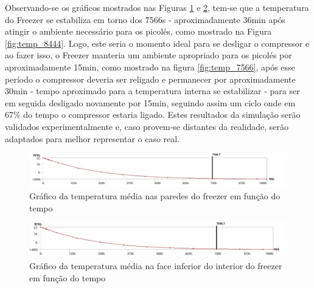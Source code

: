 \begin{itemize}

Observando-se os gráficos mostrados nas Figuras \ref{fig:graph1} e \ref{fig:graph2}, tem-se que a temperatura do Freezer se estabiliza em torno dos 7566s - aproximadamente 36min após atingir o ambiente necessário para os picolés, como mostrado na Figura \ref{fig:temp_8444}. Logo, este seria o momento ideal para se desligar o compressor e ao fazer isso, o Freezer manteria um ambiente apropriado para os picolés por aproximadamente 15min, como mostrado na figura \ref{fig:temp_7566}, após esse período o compressor deveria ser religado e permanecer por aproximadamente 30min - tempo aproximado para a temperatura interna se estabilizar - para ser em seguida desligado novamente por 15min, seguindo assim um ciclo onde em 67\% do tempo o compressor estaria ligado. Estes resultados da simulação serão validados experimentalmente e, caso provem-se distantes da realidade, serão adaptados para melhor representar o caso real.

   \begin{figure}[H]
	\centering
    \includegraphics[width=\textwidth]{figuras/graph1}
    \caption{Gráfico da temperatura média nas paredes do freezer em função do tempo}
    \label{fig:graph1}
\end{figure}

   \begin{figure}[H]
	\centering
    \includegraphics[width=\textwidth]{figuras/graph2}
    \caption{Gráfico da temperatura média na face inferior do interior do freezer em função do tempo}
    \label{fig:graph2}
\end{figure}


\end{itemize}
